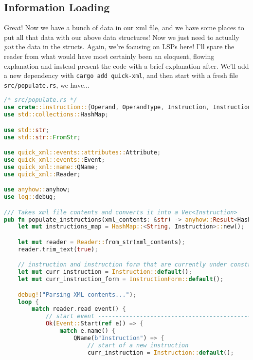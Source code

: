 \subsection{Information Loading}

Great! Now we have a bunch of data in our xml file, and we have some places to put
all that data with our above data structures! Now we just need to actually \textit{put}
the data in the structs. Again, we're focusing on LSPs here! I'll spare the reader
from what would have most certainly been an eloquent, flowing explanation and
instead present the code with a brief explanation after. We'll add a new dependency
with \texttt{cargo add quick-xml}, and then start with a fresh file \texttt{src/populate.rs},
we have...

\begin{lstlisting}[language=rust]
/* src/populate.rs */
use crate::instruction::{Operand, OperandType, Instruction, InstructionForm};
use std::collections::HashMap;

use std::str;
use std::str::FromStr;

use quick_xml::events::attributes::Attribute;
use quick_xml::events::Event;
use quick_xml::name::QName;
use quick_xml::Reader;

use anyhow::anyhow;
use log::debug;

/// Takes xml file contents and converts it into a Vec<Instruction>
pub fn populate_instructions(xml_contents: &str) -> anyhow::Result<HashMap<String, Instruction>> {
    let mut instructions_map = HashMap::<String, Instruction>::new();

    let mut reader = Reader::from_str(xml_contents);
    reader.trim_text(true);

    // instruction and instruction form that are currently under construction
    let mut curr_instruction = Instruction::default();
    let mut curr_instruction_form = InstructionForm::default();

    debug!("Parsing XML contents...");
    loop {
        match reader.read_event() {
            // start event ------------------------------------------------------------------------
            Ok(Event::Start(ref e)) => {
                match e.name() {
                    QName(b"Instruction") => {
                        // start of a new instruction
                        curr_instruction = Instruction::default();


\end{lstlisting}
